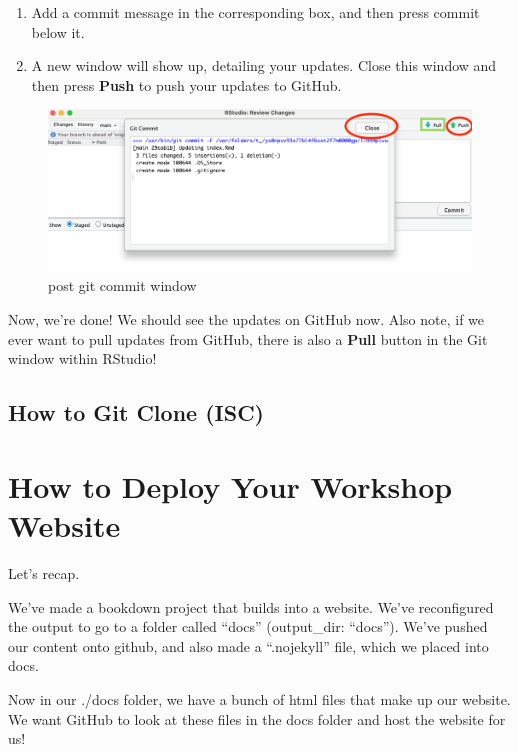 \documentclass[
]{book}
\theoremstyle{definition}
\theoremstyle{definition}
\theoremstyle{definition}
\theoremstyle{definition}
\theoremstyle{remark}
\begin{document}
\begin{enumerate}
\def\labelenumi{\arabic{enumi}.}
\setcounter{enumi}{14}
\item
  Add a commit message in the corresponding box, and then press commit below it.
\item
  A new window will show up, detailing your updates. Close this window and then press \textbf{Push} to push your updates to GitHub.
\end{enumerate}

\begin{figure}
\centering
\includegraphics{img/git-instruct/git-window-post-commit.png}
\caption{post git commit window}
\end{figure}

Now, we're done! We should see the updates on GitHub now. Also note, if we ever want to pull updates from GitHub, there is also a \textbf{Pull} button in the Git window within RStudio!

\section{How to Git Clone (ISC)}\label{how-to-git-clone-isc}

\chapter{How to Deploy Your Workshop Website}\label{how-to-deploy-your-workshop-website-1}

Let's recap.

We've made a bookdown project that builds into a website. We've reconfigured the output to go to a folder called ``docs'' (output\_dir: ``docs''). We've pushed our content onto github, and also made a ``.nojekyll'' file, which we placed into docs.

Now in our ./docs folder, we have a bunch of html files that make up our website. We want GitHub to look at these files in the docs folder and host the website for us!
\end{document}
